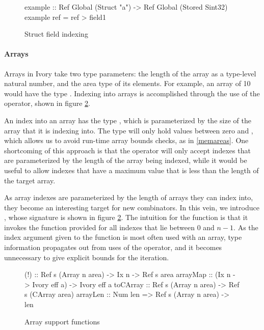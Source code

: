 \begin{figure}[h]
\begin{code}
example :: Ref Global (Struct "a")
        -> Ref Global (Stored Sint32)
example ref = ref \mytilde> field1
\end{code}
\caption{Struct field indexing}
\label{example-struct-label}
\end{figure}

\paragraph{Arrays}
Arrays in Ivory take two type parameters: the length of the array as a
type-level natural number, and the area type of its elements.  For example, an
array of 10  would have the type .  Indexing into arrays is accomplished through the use of the \cd{(!)}
operator, shown in figure \ref{array-support-functions}.

An index into an array has the type , which is parameterized by the size
of the array that it is indexing into.  The  type will only hold
values between zero and , which allows us to avoid run-time array bounds
checks, as in \ref{memareas}.  One shortcoming of this approach is that the
\cd{(!)} operator will only accept indexes that are parameterized by the length
of the array being indexed, while it would be useful to allow indexes that have
a maximum value that is less than the length of the target array.

As array indexes are parameterized by the length of arrays they can index into,
they become an interesting target for new combinators.  In this vein, we
introduce , whose signature is shown in figure
\ref{array-support-functions}.  The intuition for the  function is
that it invokes the function provided for all indexes that lie between $0$ and
$n - 1$.  As the index argument given to the function is most often used with an
array, type information propagates out from uses of the \cd{(!)} operator, and
it becomes unnecessary to give explicit bounds for the iteration.

\begin{figure}
\begin{code}
(!)      :: Ref s (Array n area) -> Ix n -> Ref s area
arrayMap :: (Ix n -> Ivory eff a) -> Ivory eff a
toCArray :: Ref s (Array n area) -> Ref s (CArray area)
arrayLen :: Num len => Ref s (Array n area) -> len
\end{code}
\caption{Array support functions}
\label{array-support-functions}
\end{figure}

